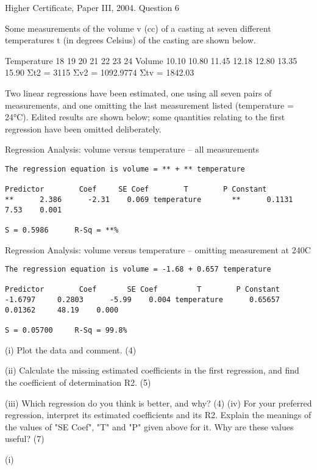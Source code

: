 \documentclass[a4paper,12pt]{article}
\begin{document}
Higher Certificate, Paper III, 2004.  Question 6 


\begin{framed}
Some measurements of the volume v (cc) of a casting at seven different temperatures t (in degrees Celsius) of the casting are shown below.  
 
Temperature 18 19 20 21 22 23 24 Volume 10.10 10.80 11.45 12.18 12.80 13.35 15.90 
        Σt2 = 3115 Σv2 = 1092.9774 Σtv = 1842.03 
 
Two linear regressions have been estimated, one using all seven pairs of measurements, and one omitting the last measurement listed (temperature = 24°C).  Edited results are shown below;  some quantities relating to the first regression have been omitted deliberately. 
 
Regression Analysis: volume versus temperature – all measurements 
\begin{verbatim}
The regression equation is volume = ** + ** temperature 
 
Predictor        Coef     SE Coef        T        P Constant          **      2.386      -2.31    0.069 temperature       **      0.1131      7.53    0.001 
 
S = 0.5986      R-Sq = **%     
\end{verbatim}

Regression Analysis: volume versus temperature – omitting measurement at 240C 
\begin{verbatim}
The regression equation is volume = -1.68 + 0.657 temperature 
 
Predictor        Coef       SE Coef         T        P Constant        -1.6797     0.2803      -5.99    0.004 temperature      0.65657    0.01362     48.19    0.000 
 
S = 0.05700     R-Sq = 99.8%      
\end{verbatim}  
 
(i) Plot the data and comment. 
(4) 
 
(ii) Calculate the missing estimated coefficients in the first regression, and find the coefficient of determination R2. (5) 
 
(iii) Which regression do you think is better, and why? 
(4) 
 (iv) For your preferred regression, interpret its estimated coefficients and its R2.  Explain the meanings of the values of "SE Coef", "T" and "P" given above for it.  Why are these values useful? (7) 
 

\end{framed} 
(i) 
 
\end{document}
